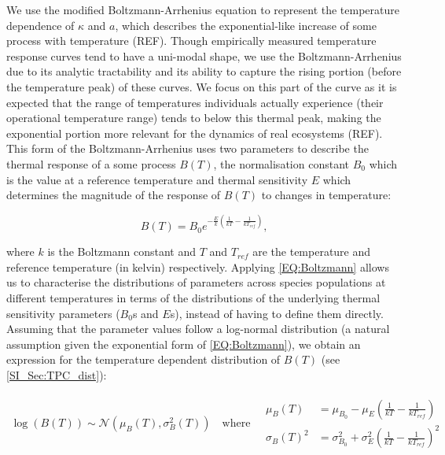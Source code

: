 \documentclass{article}
\begin{document}
We use the modified Boltzmann-Arrhenius equation to represent the temperature dependence of $\kappa$ and $a$, which describes the exponential-like increase of some process with temperature (REF). Though empirically measured temperature response curves tend to have a uni-modal shape, we use the Boltzmann-Arrhenius due to its analytic tractability and its ability to capture the rising portion (before the temperature peak) of these curves. We focus on this part of the curve as it is expected that the range of temperatures individuals actually experience (their operational temperature range) tends to below this thermal peak, making the exponential portion more relevant for the dynamics of real ecosystems (REF). This form of the Boltzmann-Arrhenius uses two parameters to describe the thermal response of a some process $B(T)$, the normalisation constant $B_0$ which is the value at a reference temperature and thermal sensitivity $E$ which determines the magnitude of the response of $B(T)$ to changes in temperature:

\begin{equation} \label{EQ:Boltzmann}
    B(T) = B_0 e^{-\frac{E}{k} \left(\frac{1}{kT} - \frac{1}{k T_{ref} }\right)},
\end{equation}

where $k$ is the Boltzmann constant and $T$ and $T_{ref}$ are the temperature and reference temperature (in kelvin) respectively. Applying \cref{EQ:Boltzmann} allows us to characterise the distributions of parameters across species populations at different temperatures in terms of the distributions of the underlying thermal sensitivity parameters ($B_0$s and $E$s), instead of having to define them directly. Assuming that the parameter values follow a log-normal distribution (a natural assumption given the exponential form of \cref{EQ:Boltzmann}), we obtain an expression for the temperature dependent distribution of $B(T)$ (see \cref{SI_Sec:TPC_dist}):

\begin{align} \label{EQ:Boltz_dist}
    \log(B(T)) \sim \mathcal{N}\left(\mu_{B}(T) , \sigma_{B}^2(T) \right) 
    \quad \text{where} \quad
    \begin{array}{cc}
        \mu_B(T) &= \mu_{B_0} - \mu_{E} \left(\frac{1}{kT} - \frac{1}{k T_{ref} }\right)  \\
        \sigma_{B}(T)^2 &= \sigma_{B_0}^2 + \sigma_{E}^2 \left(\frac{1}{kT} - \frac{1}{k T_{ref} }\right)^2
    \end{array}
\end{align}
\end{document}
